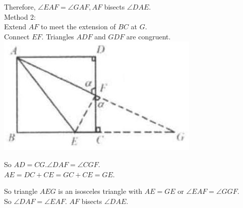 \documentclass{article}
\begin{document}
Therefore, \(\angle E A F=\angle G A F, A F\) bisects \(\angle D A E\).\\
Method 2:\\
Extend \(A F\) to meet the extension of \(B C\) at \(G\).\\
Connect \(E F\). Triangles \(A D F\) and \(G D F\) are congruent.\\
\centering
\includegraphics[width=\textwidth]{images/060(2).jpg}

So \(A D=C G . \angle D A F=\angle C G F\).\\
\(A E=D C+C E=G C+C E=G E\).

So triangle \(A E G\) is an isosceles triangle with \(A E=G E\) or \(\angle E A F=\angle G G F\).\\
So \(\angle D A F=\angle E A F\). \(A F\) bisects \(\angle D A E\).
\end{document}
